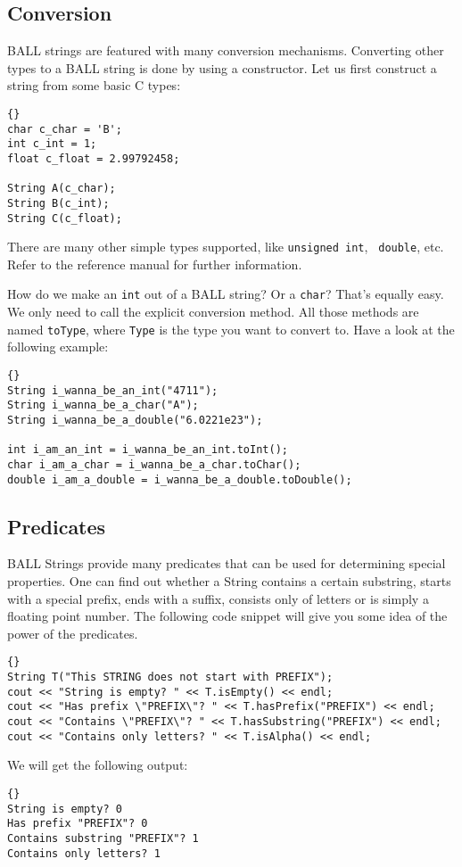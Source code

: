 \subsection{Conversion}

BALL strings are featured with many conversion mechanisms. Converting other
types to a BALL string is done by using a constructor. Let us first construct
a string from some basic C types:
\begin{lstlisting}{}
char c_char = 'B';
int c_int = 1;
float c_float = 2.99792458;

String A(c_char);
String B(c_int);
String C(c_float);
\end{lstlisting}
There are many other simple types supported, like {\tt unsigned int}, {\tt
double}, etc. Refer to the reference manual for further information.

\noindent
How do we make an {\tt int} out of a BALL string? Or a {\tt char}? That's
equally easy. We only need to call the explicit conversion method. All those
methods are named {\tt toType}, where {\tt Type} is the type you want to
convert to. Have a look at the following example:
\begin{lstlisting}{}
String i_wanna_be_an_int("4711");
String i_wanna_be_a_char("A");
String i_wanna_be_a_double("6.0221e23");

int i_am_an_int = i_wanna_be_an_int.toInt();
char i_am_a_char = i_wanna_be_a_char.toChar();
double i_am_a_double = i_wanna_be_a_double.toDouble();
\end{lstlisting}

\subsection{Predicates}

BALL Strings provide many predicates that can be used for determining special
properties. One can find out whether a String contains a certain substring, 
starts with a special prefix, ends with a suffix, consists only of letters or 
is simply a floating point number. The following code snippet will give you
some idea of the power of the predicates.
\begin{lstlisting}{}
String T("This STRING does not start with PREFIX");
cout << "String is empty? " << T.isEmpty() << endl;
cout << "Has prefix \"PREFIX\"? " << T.hasPrefix("PREFIX") << endl;
cout << "Contains \"PREFIX\"? " << T.hasSubstring("PREFIX") << endl;
cout << "Contains only letters? " << T.isAlpha() << endl;
\end{lstlisting}
We will get the following output:
\begin{lstlisting}{}
String is empty? 0
Has prefix "PREFIX"? 0
Contains substring "PREFIX"? 1
Contains only letters? 1
\end{lstlisting}

